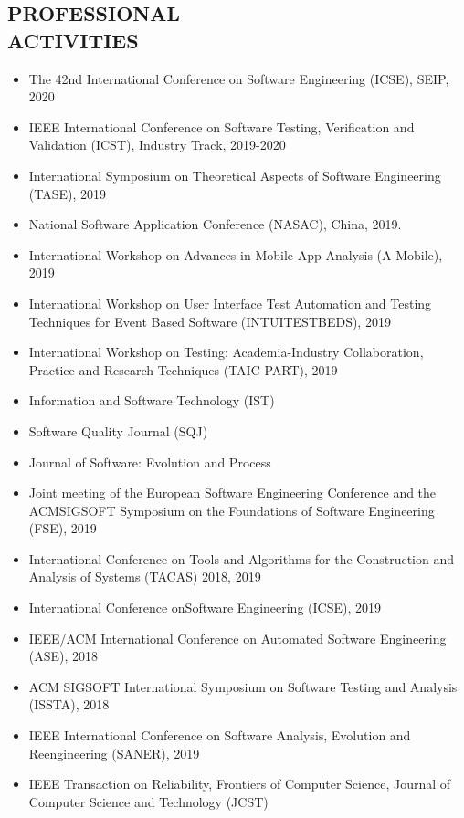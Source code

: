 \documentclass[margin]{res}
\begin{document}
\begin{resume}
\section{PROFESSIONAL\\ACTIVITIES}
\begin{itemize}[leftmargin=*]
	\item The 42nd International Conference on Software Engineering (ICSE), SEIP, 2020
    \item IEEE International Conference on Software Testing, Verification and Validation (ICST), Industry Track, 2019-2020
    \item International Symposium on Theoretical Aspects of Software Engineering (TASE), 2019
    \item National Software Application Conference (NASAC), China, 2019.  
    \item International Workshop on Advances in Mobile App Analysis (A-Mobile), 2019
    \item International Workshop on User Interface Test Automation and Testing Techniques for Event Based Software (INTUITESTBEDS), 2019
    \item International Workshop on Testing: Academia-Industry Collaboration, Practice and Research Techniques (TAIC-PART), 2019
\end{itemize}
\begin{itemize}[leftmargin=*]
    \item Information and Software Technology (IST)
    \item Software Quality Journal (SQJ)
    \item Journal of Software: Evolution and Process 
\end{itemize}
\begin{itemize}[leftmargin=*]
    \item Joint meeting of the European Software Engineering Conference and the ACMSIGSOFT Symposium on the Foundations of Software Engineering (FSE), 2019
    \item International Conference on Tools and Algorithms for the Construction and Analysis of Systems (TACAS) 2018, 2019
    \item International Conference onSoftware Engineering (ICSE), 2019
    \item IEEE/ACM  International  Conference  on  Automated  Software  Engineering (ASE), 2018
    \item ACM SIGSOFT International Symposium on Software Testing and Analysis (ISSTA), 2018
    \item IEEE International Conference on Software Analysis, Evolution and Reengineering (SANER), 2019
    \item IEEE Transaction on Reliability, Frontiers of Computer Science, Journal of Computer Science and Technology (JCST)
\end{itemize}


\end{resume}
\end{document}
